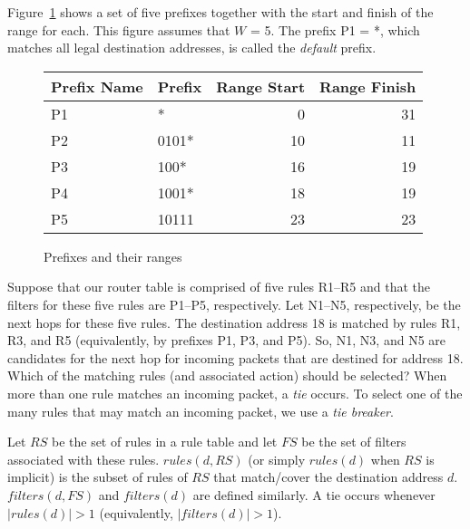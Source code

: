 Figure~\ref{fig:ranges} shows a set of five prefixes together with the start
and finish of the range for each. This figure assumes that $W$ = 5.
The prefix P1 = *, which matches all legal destination addresses, is called the
{\em default} prefix.


\begin{figure}
\begin{center}
\begin{tabular}{|l|l|r|r|}
Prefix Name& Prefix & Range Start & Range Finish \\ \hline
P1 & * & 0 & 31\\
P2 & 0101* & 10 & 11 \\
P3 & 100* & 16 & 19 \\
P4 & 1001* & 18 & 19 \\
P5 & 10111 & 23 & 23 \\
\end{tabular}
\end{center}
\caption{Prefixes and their ranges
\label{fig:ranges}}
\end{figure}

Suppose that our router table is comprised of five rules R1--R5 and that
the filters for these five rules are P1--P5, respectively.
Let N1--N5, respectively, be the next hops for these five rules.
The destination address 18 is matched by rules R1, R3, and R5 (equivalently,
by prefixes P1, P3, and P5). So, N1, N3, and N5 are candidates for the next hop
for incoming packets that are destined for address 18. Which of the
matching rules (and associated action) should be selected? When more than one
rule matches an incoming packet, a {\em tie} occurs. To
select one of the many rules that may match an incoming
packet, we use a {\em tie breaker}. 

Let $RS$ be the set of rules in a rule table and
let $FS$ be the set of filters associated with these rules.
$rules(d,RS)$ (or simply $rules(d)$
when $RS$ is implicit)
is the subset of rules of $RS$ that match/cover the destination address
$d$.
$filters(d,FS)$ and $filters(d)$ are defined similarly.
A tie occurs whenever $|rules(d)| > 1$ (equivalently, $|filters(d)| > 1$).

